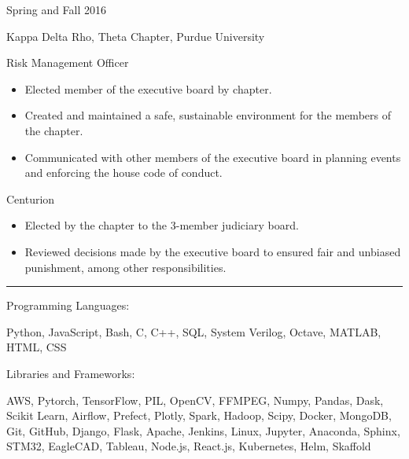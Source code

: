 \documentclass[10pt]{article}
\newlength{\cvcolumngapwidth}
\newlength{\cvleftcolumnwidth}
\newlength{\cvrightcolumnwidth}
\newcommand{\cvsectionstyle}[1]{{\normalsize\cvsectionfont\textcolor{cvsectioncolor}{#1}}}
\newcommand{\cvtitlestyle}[1]{{\large\cvtitlefont\textcolor{cvtitlecolor}{#1}}}
\newcommand{\cvdurationstyle}[1]{{\small\cvdurationfont\textcolor{cvdurationcolor}{#1}}}
\newcommand{\cvheadingstyle}[1]{{\normalsize\cvheadingfont\textcolor{cvheadingcolor}{#1}}}
\newlength{\cvafteritemskipamount}
\newlength{\cvaftersectionskipamount}
\newlength{\cvbetweensectionandheadingextraskipamount}
\newlength{\cvparskip}
\newcommand{\cvsection}[1]{
    \begin{minipage}[t]{\cvleftcolumnwidth}
        \raggedleft\cvsectionstyle{#1}
    \end{minipage}%
    \hspace{\cvcolumngapwidth}%
    \begin{minipage}[t]{\cvrightcolumnwidth}
        \textcolor{cvrulecolor}{\rule{\cvrightcolumnwidth}{0.3mm}}
    \end{minipage}

    \vspace{\cvaftersectionskipamount}
}
\newcommand{\cvitem}[2]{
    \begin{minipage}[t]{\cvleftcolumnwidth}
        \raggedleft #1
    \end{minipage}%
    \hspace{\cvcolumngapwidth}%
    \begin{minipage}[t]{\cvrightcolumnwidth}
        \setlength{\parskip}{\cvparskip} #2
    \end{minipage}

    \vspace{\cvafteritemskipamount}
}
\newcommand{\cvtitle}[1]{
    \cvtitlestyle{#1}

    \vspace{1mm plus 0.25mm minus 0.25mm}
    \vspace{-\cvparskip}
}
\begin{document}
\cvitem{
    \cvdurationstyle{Spring and Fall 2016}
}{
    \cvtitle{Kappa Delta Rho, Theta Chapter, Purdue University}
    
    Risk Management Officer

    \begin{itemize}[leftmargin=*]
        \item Elected member of the executive board by chapter.
        \item Created and maintained a safe, sustainable environment for the members of the chapter.
        \item Communicated with other members of the executive board in planning events and enforcing the house code of conduct. 
    \end{itemize}
    
    Centurion

    \begin{itemize}[leftmargin=*]
        \item Elected by the chapter to the 3-member judiciary board.
        \item Reviewed decisions made by the executive board to ensured fair and unbiased punishment, among other responsibilities.
    \end{itemize}
}
\fi
\cvsection{SKILLS}

\vspace{\cvbetweensectionandheadingextraskipamount}
\cvitem{
    \cvheadingstyle{Programming Languages:}
}{
    Python, JavaScript, Bash, C, C++, SQL, System Verilog, Octave, MATLAB, HTML, CSS
}
\cvitem{
    \cvheadingstyle{Libraries and Frameworks:}
}{
    AWS, Pytorch, TensorFlow, PIL, OpenCV, FFMPEG, Numpy, Pandas, Dask, Scikit Learn, Airflow, Prefect, Plotly, Spark, Hadoop, Scipy, Docker, MongoDB, Git, GitHub, Django, Flask, Apache, Jenkins, Linux, Jupyter, Anaconda, Sphinx, STM32, EagleCAD, Tableau, Node.js, React.js, Kubernetes, Helm, Skaffold
}
\end{document}
